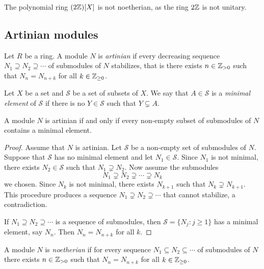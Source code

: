 \begin{example}
    The polynomial ring $(2\mathbb{Z})[X]$ is not 
    noetherian, as the ring $2\mathbb{Z}$ is not unitary. 
\end{example}

\subsection{Artinian modules}

\begin{definition}
	Let $R$ be a ring. A module $N$ is \emph{artinian} if every decreasing sequence 
	$N_1\supseteq N_2\supseteq\cdots$ of submodules of $N$ stabilizes, that is
	there exists $n\in\mathbb{Z}_{>0}$ such that 
	$N_n=N_{n+k}$ for all $k\in\mathbb{Z}_{\geq0}$.
\end{definition}

Let $X$ be a set and $\mathcal{S}$ be a set of subsets of $X$. 
We say that $A\in\mathcal{S}$ is a \emph{minimal element} of $\mathcal{S}$
if there is no $Y\in\mathcal{S}$ such that $Y\subsetneq A$. 

\begin{proposition}
\label{pro:artinian_minimal}
	A module $N$ is artinian if and only if 
	every non-empty subset of submodules of $N$ 
	contains a minimal element. 
\end{proposition}

\begin{proof}
	Assume that $N$ is artinian. Let $\mathcal{S}$ be a non-empty set of submodules of $N$. 
	Suppose that $\mathcal{S}$ has no minimal element and let $N_1\in\mathcal{S}$. 
	Since $N_1$ is not minimal, there exists 
	$N_2\in\mathcal{S}$ such that $N_1\supsetneq N_2$. Now assume the 
	submodules 
	\[
	N_1\supsetneq N_2\supsetneq\cdots\supsetneq N_k
	\]
	we chosen. 
	Since $N_k$ is not minimal, there exists $N_{k+1}$ such that $N_k\supsetneq N_{k+1}$.
	This procedure produces a sequence $N_1\supsetneq
	N_2\supsetneq\cdots$ that cannot stabilize, a contradiction. 
	
	If $N_1\supseteq N_2\supseteq\cdots$ is a sequence of submodules, then 
	$\mathcal{S}=\{N_j:j\geq1\}$ has a minimal element, say $N_n$. Then
	$N_n=N_{n+k}$ for all $k$. 
\end{proof}

A module $N$ is \emph{noetherian} if for every sequence 
$N_1\subseteq N_2\subseteq\cdots$ of submodules of $N$ there exists $n\in\mathbb{Z}_{>0}$ such that 
$N_n=N_{n+k}$ for all $k\in\mathbb{Z}_{\geq0}$. 

